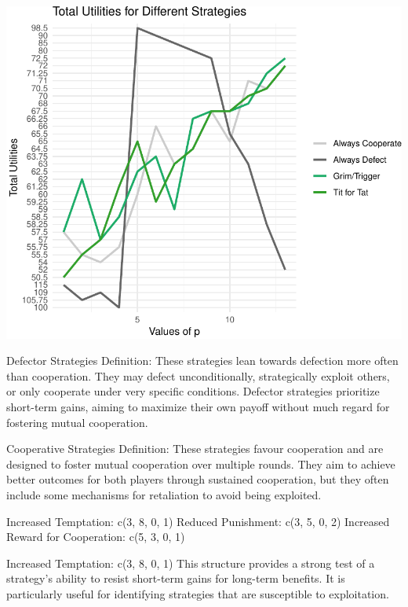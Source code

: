 \documentclass[11pt,preprint]{elsarticle}
\let\origfigure\figure
\let\endorigfigure\endfigure
\renewenvironment{figure}[1][2] {
    \expandafter\origfigure\expandafter[H]
} {
    \endorigfigure
}
\numberwithin{equation}{section}
\numberwithin{figure}{section}
\numberwithin{table}{section}
\begin{document}
\begin{figure}[H]

{\centering \includegraphics{Prisoners-Dilemma_files/figure-latex/unnamed-chunk-7-1} 

}

\caption{Strategy Ranks Across Different Values of p\label{pvalues}}\label{fig:unnamed-chunk-7}
\end{figure}

Defector Strategies Definition: These strategies lean towards defection
more often than cooperation. They may defect unconditionally,
strategically exploit others, or only cooperate under very specific
conditions. Defector strategies prioritize short-term gains, aiming to
maximize their own payoff without much regard for fostering mutual
cooperation.

Cooperative Strategies Definition: These strategies favour cooperation
and are designed to foster mutual cooperation over multiple rounds. They
aim to achieve better outcomes for both players through sustained
cooperation, but they often include some mechanisms for retaliation to
avoid being exploited.

Increased Temptation: c(3, 8, 0, 1) Reduced Punishment: c(3, 5, 0, 2)
Increased Reward for Cooperation: c(5, 3, 0, 1)

Increased Temptation: c(3, 8, 0, 1) This structure provides a strong
test of a strategy's ability to resist short-term gains for long-term
benefits. It is particularly useful for identifying strategies that are
susceptible to exploitation.
\end{document}
